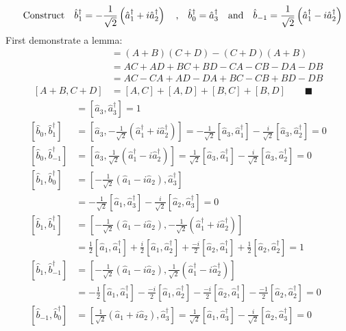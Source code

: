 \documentclass{amsart}
\begin{document}
\[\qq{Construct}\hat{b}^\dagger_1=-\frac{1}{\sqrt{2}}\left(\hat{a}^\dagger_1+i\hat{a}^\dagger_2\right)\qq{,}\hat{b}^\dagger_0=\hat{a}^\dagger_3\qq{and}\hat{b}_{-1}=\frac{1}{\sqrt{2}}\left(\hat{a}^\dagger_1-i\hat{a}^\dagger_2\right)\]
First demonstrate a lemma:
\begin{align*}
[A+B,C+D]&=(A+B)(C+D)-(C+D)(A+B)\\
&=AC+AD+BC+BD-CA-CB-DA-DB\\
&=AC-CA+AD-DA+BC-CB+BD-DB\\
[A+B,C+D]&=[A,C]+[A,D]+[B,C]+[B,D]\qquad\blacksquare
\end{align*}
\begin{align*}
[\hat{b}_0,\hat{b}^\dagger_0]&=[\hat{a}_3,\hat{a}^\dagger_3]=1\\
[\hat{b}_0,\hat{b}^\dagger_1]&=[\hat{a}_3,-\frac{1}{\sqrt{2}}\left(\hat{a}^\dagger_1+i\hat{a}^\dagger_2\right)]=-\frac{1}{\sqrt{2}}[\hat{a}_3,\hat{a}^\dagger_1]-\frac{i}{\sqrt{2}}[\hat{a}_3,\hat{a}^\dagger_2]=0\\
[\hat{b}_0,\hat{b}^\dagger_{-1}]&=[\hat{a}_3,\frac{1}{\sqrt{2}}\left(\hat{a}^\dagger_1-i\hat{a}^\dagger_2\right)]=\frac{1}{\sqrt{2}}[\hat{a}_3,\hat{a}^\dagger_1]-\frac{i}{\sqrt{2}}[\hat{a}_3,\hat{a}^\dagger_2]=0\\
[\hat{b}_1,\hat{b}^\dagger_0]&=[-\frac{1}{\sqrt{2}}\left(\hat{a}_1-i\hat{a}_2\right),\hat{a}^\dagger_3]\\
&=-\frac{1}{\sqrt{2}}[\hat{a}_1,\hat{a}^\dagger_3]-\frac{i}{\sqrt{2}}[\hat{a}_2,\hat{a}^\dagger_3]=0\\
[\hat{b}_1,\hat{b}^\dagger_1]&=[-\frac{1}{\sqrt{2}}\left(\hat{a}_1-i\hat{a}_2\right),-\frac{1}{\sqrt{2}}\left(\hat{a}^\dagger_1+i\hat{a}^\dagger_2\right)]\\
&=\frac{1}{2}[\hat{a}_1,\hat{a}^\dagger_1]+\frac{i}{2}[\hat{a}_1,\hat{a}^\dagger_2]+\frac{-i}{2}[\hat{a}_2,\hat{a}^\dagger_1]+\frac{1}{2}[\hat{a}_2,\hat{a}^\dagger_2]=1\\
[\hat{b}_1,\hat{b}^\dagger_{-1}]&=[-\frac{1}{\sqrt{2}}\left(\hat{a}_1-i\hat{a}_2\right),\frac{1}{\sqrt{2}}\left(\hat{a}^\dagger_1-i\hat{a}^\dagger_2\right)]\\
&=-\frac{1}{2}[\hat{a}_1,\hat{a}^\dagger_1]-\frac{-i}{2}[\hat{a}_1,\hat{a}^\dagger_2]-\frac{-i}{2}[\hat{a}_2,\hat{a}^\dagger_1]-\frac{-1}{2}[\hat{a}_2,\hat{a}^\dagger_2]=0\\
[\hat{b}_{-1},\hat{b}^\dagger_0]&=[\frac{1}{\sqrt{2}}\left(\hat{a}_1+i\hat{a}_2\right),\hat{a}^\dagger_3]=\frac{1}{\sqrt{2}}[\hat{a}_1,\hat{a}^\dagger_3]-\frac{i}{\sqrt{2}}[\hat{a}_2,\hat{a}^\dagger_3]=0\\

\end{align*}
\end{document}
